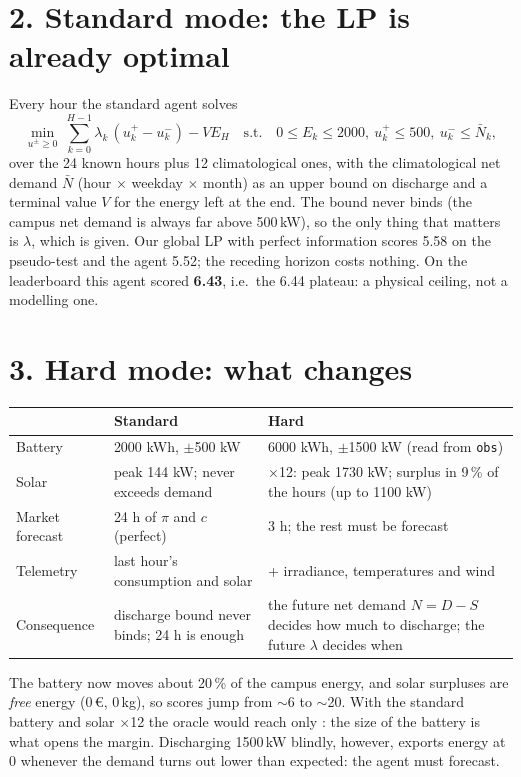\documentclass[11pt,a4paper]{article}
\begin{document}
\section*{2. Standard mode: the LP is already optimal}
Every hour the standard agent solves
\[
\min_{u^\pm\ge0}\ \sum_{k=0}^{H-1}\lambda_k\,(u_k^+-u_k^-)-V E_H\quad\text{s.t.}\quad 0\le E_k\le 2000,\ u^+_k\le 500,\ u^-_k\le \bar N_k ,
\]
over the 24 known hours plus 12 climatological ones, with the climatological net demand $\bar N$ (hour $\times$ weekday $\times$ month) as an upper bound on discharge and a terminal value $V$ for the energy left at the end. The bound never binds (the campus net demand is always far above 500\,kW), so the only thing that matters is $\lambda$, which is given. Our global LP with perfect information scores 5.58 on the pseudo-test and the agent 5.52; the receding horizon costs nothing. On the leaderboard this agent scored \textbf{6.43}, i.e.\ the 6.44 plateau: a physical ceiling, not a modelling one.

\section*{3. Hard mode: what changes}
\begin{tabularx}{\linewidth}{@{}lXX@{}}
\toprule
 & \textbf{Standard} & \textbf{Hard}\\
\midrule
Battery & 2000 kWh, $\pm$500 kW & 6000 kWh, $\pm$1500 kW (read from \texttt{obs}) \\
Solar & peak 144 kW; never exceeds demand & $\times$12: peak 1730 kW; surplus in 9\,\% of the hours (up to 1100 kW)\\
Market forecast & 24 h of $\pi$ and $c$ (perfect) & 3 h; the rest must be forecast\\
Telemetry & last hour's consumption and solar & + irradiance, temperatures and wind\\
Consequence & discharge bound never binds; 24 h is enough & the future net demand $N=D-S$ decides how much to discharge; the future $\lambda$ decides when\\
\bottomrule
\end{tabularx}

The battery now moves about 20\,\% of the campus energy, and solar surpluses are \emph{free} energy (0\,\euro, 0\,kg), so scores jump from $\sim$6 to $\sim$20. With the standard battery and solar $\times$12 the oracle would reach only \scoreOracleStd{}: the size of the battery is what opens the margin. Discharging 1500\,kW blindly, however, exports energy at 0 whenever the demand turns out lower than expected: the agent must forecast.
\end{document}
